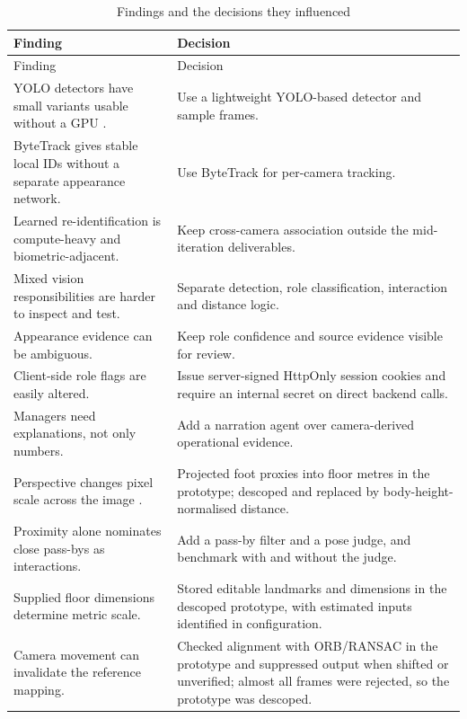 \begin{longtable}{P{0.38\textwidth}P{0.5\textwidth}}
\caption{Findings and the decisions they influenced}\\
\toprule
Finding & Decision\\
\midrule
\endfirsthead
\toprule
Finding & Decision\\
\midrule
\endhead
YOLO detectors have small variants usable without a GPU \cite{redmon2016yolo,ultralytics}. & Use a lightweight YOLO-based detector and sample frames.\\
ByteTrack \cite{zhang2022bytetrack} gives stable local IDs without a separate appearance network. & Use ByteTrack for per-camera tracking.\\
Learned re-identification \cite{ye2022reid} is compute-heavy and biometric-adjacent. & Keep cross-camera association outside the mid-iteration deliverables.\\
Mixed vision responsibilities are harder to inspect and test. & Separate detection, role classification, interaction and distance logic.\\
Appearance evidence can be ambiguous. & Keep role confidence and source evidence visible for review.\\
Client-side role flags are easily altered. & Issue server-signed HttpOnly session cookies and require an internal secret on direct backend calls.\\
Managers need explanations, not only numbers. & Add a narration agent over camera-derived operational evidence.\\
Perspective changes pixel scale across the image \cite{hartley2004multiple,opencvHomography}. & Projected foot proxies into floor metres in the prototype; descoped and replaced by body-height-normalised distance.\\
Proximity alone nominates close pass-bys as interactions. & Add a pass-by filter and a pose judge, and benchmark with and without the judge.\\
Supplied floor dimensions determine metric scale. & Stored editable landmarks and dimensions in the descoped prototype, with estimated inputs identified in configuration.\\
Camera movement can invalidate the reference mapping. & Checked alignment with ORB/RANSAC in the prototype and suppressed output when shifted or unverified; almost all frames were rejected, so the prototype was descoped.\\
\bottomrule
\end{longtable}
